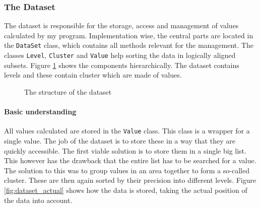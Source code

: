 \documentclass[10pt,a4paper,titlepage]{article}
\begin{document}
	\subsubsection{The Dataset}
	The dataset is responsible for the storage, access and management of values calculated by my program. Implementation wise, the central parts are located in the \verb|DataSet| class, which contains all methods relevant for the management. The classes \verb|Level|, \verb|Cluster| and \verb|Value| help sorting the data in logically aligned subsets. Figure \ref{fig:dataset_hierarchy} shows the components hierarchically. The dataset contains levels and these contain cluster which are made of values.
	
	\begin{figure}
		\centering
		\caption{The structure of the dataset}
		\label{fig:dataset_hierarchy}
	\end{figure}
	\paragraph{Basic understanding}
	All values calculated are stored in the \verb|Value| class. This class is a wrapper for a single value. The job of the dataset is to store these in a way that they are quickly accessible. The first viable solution is to store them in a single big list. This however has the drawback that the entire list has to be searched for a value. The solution to this was to group values in an area together to form a so-called cluster. These are then again sorted by their precision into different levels. Figure \ref{fig:dataset_actual} shows how the data is stored, taking the actual position of the data into account. 
	
\end{document}
